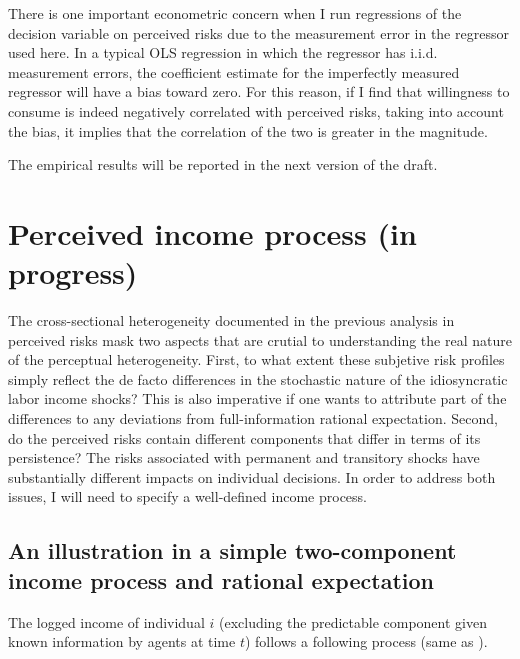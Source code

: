 \documentclass[12pt,notitlepage,onecolumn,aps,pra]{article}
\begin{document}
There is one important econometric concern when I run regressions of the
decision variable on perceived risks due to the measurement error in the
regressor used here. In a typical OLS regression in which the regressor
has i.i.d. measurement errors, the coefficient estimate for the
imperfectly measured regressor will have a bias toward zero. For this
reason, if I find that willingness to consume is indeed negatively
correlated with perceived risks, taking into account the bias, it
implies that the correlation of the two is greater in the magnitude.

The empirical results will be reported in the next version of the draft.



    \hypertarget{perceived-income-process-in-progress}{%
\section{Perceived income process (in
progress)}\label{perceived-income-process-in-progress}}

The cross-sectional heterogeneity documented in the previous analysis in
perceived risks mask two aspects that are crutial to understanding the
real nature of the perceptual heterogeneity. First, to what extent these
subjetive risk profiles simply reflect the de facto differences in the
stochastic nature of the idiosyncratic labor income shocks? This is also
imperative if one wants to attribute part of the differences to any
deviations from full-information rational expectation. Second, do the
perceived risks contain different components that differ in terms of its
persistence? The risks associated with permanent and transitory shocks
have substantially different impacts on individual decisions. In order
to address both issues, I will need to specify a well-defined income
process.

\hypertarget{an-illustration-in-a-simple-two-component-income-process-and-rational-expectation}{%
\subsection{An illustration in a simple two-component income process and
rational
expectation}\label{an-illustration-in-a-simple-two-component-income-process-and-rational-expectation}}

The logged income of individual \(i\) (excluding the predictable
component given known information by agents at time \(t\)) follows a
following process (same as \cite{carroll1997nature}).
\end{document}
